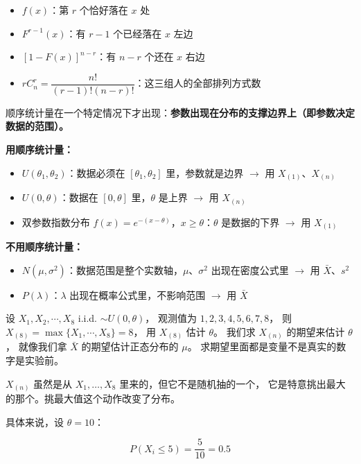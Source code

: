 \begin{note}[拆解记忆]
\begin{itemize}
  \item $f(x)$：第 $r$ 个恰好落在 $x$ 处
  \item $F^{r-1}(x)$：有 $r-1$ 个已经落在 $x$ 左边
  \item $[1-F(x)]^{n-r}$：有 $n-r$ 个还在 $x$ 右边
  \item $r C_n^r = \dfrac{n!}{(r-1)!(n-r)!}$：这三组人的全部排列方式数
\end{itemize}
\end{note}
\begin{note}[顺序统计量]
顺序统计量在一个特定情况下才出现：\textbf{参数出现在分布的支撑边界上（即参数决定数据的范围）。}

\textbf{用顺序统计量：}
\begin{itemize}
  \item $U(\theta_1, \theta_2)$：数据必须在 $[\theta_1, \theta_2]$ 里，参数就是边界 $\rightarrow$ 用 $X_{(1)}$、$X_{(n)}$
  \item $U(0, \theta)$：数据在 $[0, \theta]$ 里，$\theta$ 是上界 $\rightarrow$ 用 $X_{(n)}$
  \item 双参数指数分布 $f(x) = e^{-(x-\theta)}$，$x \geq \theta$：$\theta$ 是数据的下界 $\rightarrow$ 用 $X_{(1)}$
\end{itemize}

\textbf{不用顺序统计量：}
\begin{itemize}
  \item $N(\mu, \sigma^2)$：数据范围是整个实数轴，$\mu$、$\sigma^2$ 出现在密度公式里 $\rightarrow$ 用 $\bar{X}$、$s^2$
  \item $P(\lambda)$：$\lambda$ 出现在概率公式里，不影响范围 $\rightarrow$ 用 $\bar{X}$
\end{itemize}
\begin{dxtips}
    设 $X_1, X_2, \cdots, X_8$ i.i.d. $\sim U(0, \theta)$，
观测值为 $1, 2, 3, 4, 5, 6, 7, 8$，
则 $X_{(8)} = \max\{X_1, \cdots, X_8\} = 8$，
用 $X_{(8)}$ 估计 $\theta$。
我们求 $X_{(n)}$ 的期望来估计 $\theta$，
就像我们拿 $\bar{X}$ 的期望估计正态分布的 $\mu$。
求期望里面都是变量不是真实的数字是实验前。
\end{dxtips}
\begin{example}
$X_{(n)}$ 虽然是从 $X_1,\dots,X_8$ 里来的，但它不是随机抽的一个，
它是特意挑出最大的那个。挑最大值这个动作改变了分布。

具体来说，设 $\theta = 10$：

$$P(X_i \leq 5) = \frac{5}{10} = 0.5$$


\end{example}
\end{note}
